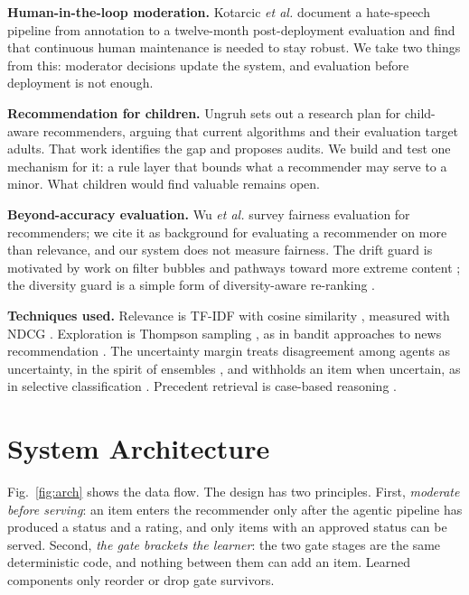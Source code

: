 \documentclass[conference]{IEEEtran}
\begin{document}
\textbf{Human-in-the-loop moderation.} Kotarcic \emph{et al.} \cite{kotarcic2022human} document a hate-speech pipeline from annotation to a twelve-month post-deployment evaluation and find that continuous human maintenance is needed to stay robust. We take two things from this: moderator decisions update the system, and evaluation before deployment is not enough.

\textbf{Recommendation for children.} Ungruh \cite{ungruh2025recommender} sets out a research plan for child-aware recommenders, arguing that current algorithms and their evaluation target adults. That work identifies the gap and proposes audits. We build and test one mechanism for it: a rule layer that bounds what a recommender may serve to a minor. What children would find valuable remains open.

\textbf{Beyond-accuracy evaluation.} Wu \emph{et al.} \cite{wu2023fairness} survey fairness evaluation for recommenders; we cite it as background for evaluating a recommender on more than relevance, and our system does not measure fairness. The drift guard is motivated by work on filter bubbles \cite{pariser2011filter} and pathways toward more extreme content \cite{ribeiro2020auditing}; the diversity guard is a simple form of diversity-aware re-ranking \cite{carbonell1998use}.

\textbf{Techniques used.} Relevance is TF-IDF with cosine similarity \cite{salton1988term}, measured with NDCG \cite{jarvelin2002cumulated}. Exploration is Thompson sampling \cite{thompson1933likelihood,chapelle2011empirical}, as in bandit approaches to news recommendation \cite{li2010contextual}. The uncertainty margin treats disagreement among agents as uncertainty, in the spirit of ensembles \cite{lakshminarayanan2017simple}, and withholds an item when uncertain, as in selective classification \cite{geifman2017selective}. Precedent retrieval is case-based reasoning \cite{aamodt1994case}.

\section{System Architecture}

Fig.~\ref{fig:arch} shows the data flow. The design has two principles. First, \emph{moderate before serving}: an item enters the recommender only after the agentic pipeline has produced a status and a rating, and only items with an approved status can be served. Second, \emph{the gate brackets the learner}: the two gate stages are the same deterministic code, and nothing between them can add an item. Learned components only reorder or drop gate survivors.
\end{document}
